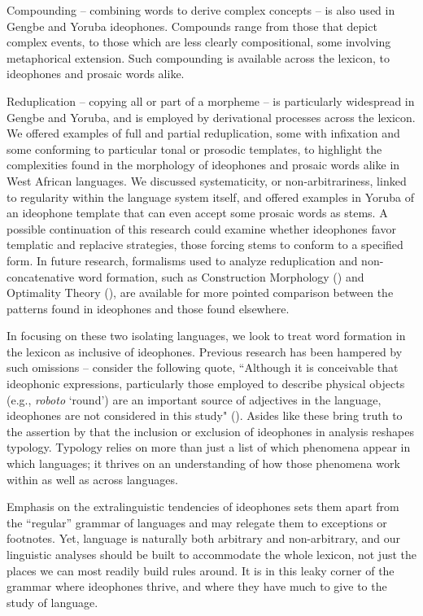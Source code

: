 \documentclass[output=paper,colorlinks,citecolor=brown]{langscibook}
\begin{document}
Compounding -- combining words to derive complex concepts -- is also used in Gengbe and Yoruba ideophones. Compounds range from those that depict complex events, to those which are less clearly compositional, some involving metaphorical extension. Such compounding is available across the lexicon, to ideophones and prosaic words alike.

Reduplication -- copying all or part of a morpheme -- is particularly widespread in Gengbe and Yoruba, and is employed by derivational processes across the lexicon. We offered examples of full and partial reduplication, some with infixation and some conforming to particular tonal or prosodic templates, to highlight the complexities found in the morphology of ideophones and prosaic words alike in West African languages. We discussed systematicity, or non-arbitrariness, linked to regularity within the language system itself, and offered examples in Yoruba of an ideophone template that can even accept some prosaic words as stems. A possible continuation of this research could examine whether ideophones favor templatic and replacive strategies, those forcing stems to conform to a specified form. In future research, formalisms used to analyze reduplication and non-concatenative word formation, such as Construction Morphology (\citealt{Booij2010, Goldberg2006}) and Optimality Theory (\citealt{McCarthy&Prince1995, PrinceandSmolensky1993}), are available for more pointed comparison between the patterns found in ideophones and those found elsewhere. 

In focusing on these two isolating languages, we look to treat word formation in the lexicon as inclusive of ideophones. Previous research has been hampered by such omissions -- consider the following quote, ``Although it is conceivable that ideophonic expressions, particularly those employed to describe physical objects (e.g., \textit{roboto} `round') are an important source of adjectives in the language, ideophones are not considered in this study" (\citealt[86]{Madugu1976}). Asides like these bring truth to the assertion by \citet{Dingemanse2018} that the inclusion or exclusion of ideophones in analysis reshapes typology. Typology relies on more than just a list of which phenomena appear in which languages; it thrives on an understanding of how those phenomena work within as well as across languages.

Emphasis on the extralinguistic tendencies of ideophones sets them apart from the “regular” grammar of languages and may relegate them to exceptions or footnotes. Yet, language is naturally both arbitrary and non-arbitrary, and our linguistic analyses should be built to accommodate the whole lexicon, not just the places we can most readily build rules around. It is in this leaky corner of the grammar where ideophones thrive, and where they have much to give to the study of language. 
\end{document}
